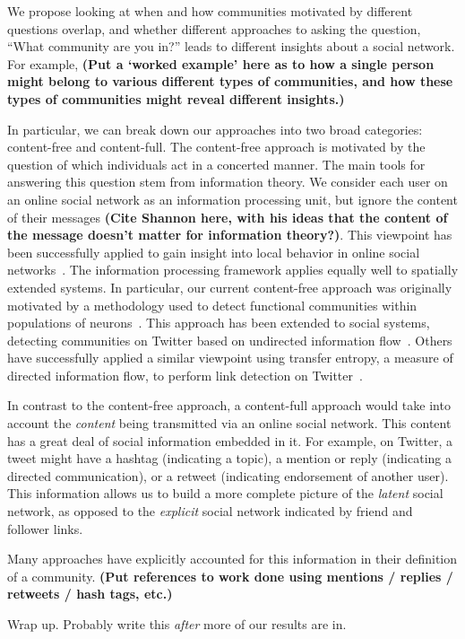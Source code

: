 We propose looking at when and how communities motivated by different questions overlap, and whether different approaches to asking the question, ``What community are you in?'' leads to different insights about a social network. For example, \textbf{(Put a `worked example' here as to how a single person might belong to various different types of communities, and how these types of communities might reveal different insights.)}

In particular, we can break down our approaches into two broad categories: content-free and content-full. The content-free approach is motivated by the question of which individuals act in a concerted manner. The main tools for answering this question stem from information theory. We consider each user on an online social network as an information processing unit, but ignore the content of their messages \textbf{(Cite Shannon here, with his ideas that the content of the message doesn't matter for information theory?)}. This viewpoint has been successfully applied to gain insight into local behavior in online social networks~\cite{darmon2013understanding}. The information processing framework applies equally well to spatially extended systems. In particular, our current content-free approach was originally motivated by a methodology used to detect functional communities within populations of neurons~\cite{shalizi2007discovering}. This approach has been extended to social systems, detecting communities on Twitter based on undirected information flow~\cite{darmon2013detecting}. Others have successfully applied a similar viewpoint using transfer entropy, a measure of directed information flow, to perform link detection on Twitter~\cite{ver2012information}.

In contrast to the content-free approach, a content-full approach would take into account the \emph{content} being transmitted via an online social network. This content has a great deal of social information embedded in it. For example, on Twitter, a tweet might have a hashtag (indicating a topic), a mention or reply (indicating a directed communication), or a retweet (indicating endorsement of another user). This information allows us to build a more complete picture of the \emph{latent} social network, as opposed to the \emph{explicit} social network indicated by friend and follower links.

Many approaches have explicitly accounted for this information in their definition of a community. \textbf{(Put references to work done using mentions / replies / retweets / hash tags, etc.)}

Wrap up. Probably write this \emph{after} more of our results are in.